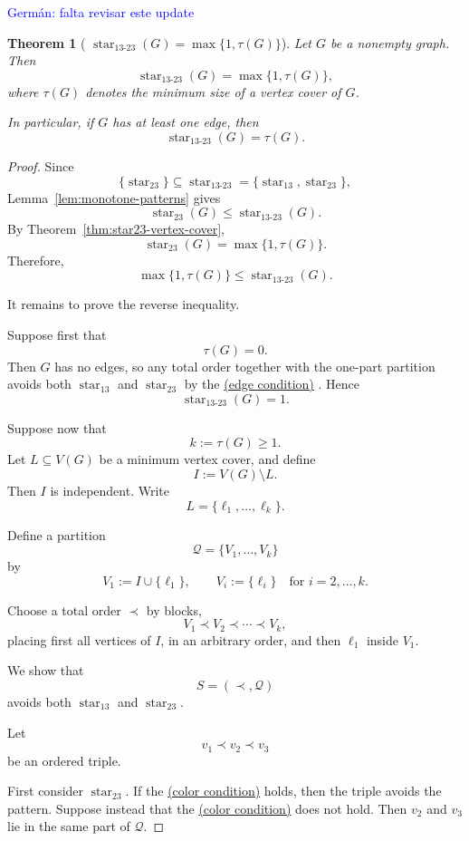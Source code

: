 \documentclass[12pt]{article}
\theoremstyle{plain}
\newtheorem{theorem}{Theorem}[section]
\theoremstyle{definition}
\theoremstyle{remark}
\theoremstyle{definition}
\newcommand{\edgecondition}{%
  \hyperref[def:avoid:cond:edge]{(edge condition)}\xspace
}
\newcommand{\colorcondition}{%
  \hyperref[def:avoid:cond:color]{(color condition)}\xspace
}
\newcommand{\starlabel}{\mathrm{star}}
\DeclareRobustCommand{\starparam}[1]{%
  \ensuremath{\mathop{\starlabel}\nolimits_{#1}}%
}
\newcommand{\german}[1]{%
  \textcolor{blue}{Germán: #1}%
}
\begin{document}
\german{falta revisar este update}

\begin{theorem}[
\texorpdfstring{
\(\starparam{13\text{-}23}(G)=\max\{1,\tau(G)\}\)}
{star13-23(G) = max\{1,tau(G)\}}
]
\label{thm:star13-23-vertex-cover}
Let \(G\) be a nonempty graph. Then
\[
\starparam{13\text{-}23}(G)
=
\max\{1,\tau(G)\},
\]
where \(\tau(G)\) denotes the minimum size of a vertex cover of \(G\).

In particular, if \(G\) has at least one edge, then
\[
\starparam{13\text{-}23}(G)=\tau(G).
\]
\end{theorem}

\begin{proof}
Since
\[
\{\starparam{23}\}
\subseteq
\starparam{13\text{-}23}
=
\{\starparam{13},\starparam{23}\},
\]
Lemma~\ref{lem:monotone-patterns} gives
\[
\starparam{23}(G)
\le
\starparam{13\text{-}23}(G).
\]
By Theorem~\ref{thm:star23-vertex-cover},
\[
\starparam{23}(G)=\max\{1,\tau(G)\}.
\]
Therefore,
\[
\max\{1,\tau(G)\}
\le
\starparam{13\text{-}23}(G).
\]

It remains to prove the reverse inequality.

Suppose first that
\[
\tau(G)=0.
\]
Then \(G\) has no edges, so any total order together with the one-part
partition avoids both \(\starparam{13}\) and \(\starparam{23}\) by the
\edgecondition{}. Hence
\[
\starparam{13\text{-}23}(G)=1.
\]

Suppose now that
\[
k:=\tau(G)\ge 1.
\]
Let \(L\subseteq V(G)\) be a minimum vertex cover, and define
\[
I:=V(G)\setminus L.
\]
Then \(I\) is independent. Write
\[
L=\{\ell_1,\dots,\ell_k\}.
\]

Define a partition
\[
\mathcal Q=\{V_1,\dots,V_k\}
\]
by
\[
V_1:=I\cup\{\ell_1\},
\qquad
V_i:=\{\ell_i\}
\quad
\text{for }i=2,\dots,k.
\]

Choose a total order \(\prec\) by blocks,
\[
V_1\prec V_2\prec\cdots\prec V_k,
\]
placing first all vertices of \(I\), in an arbitrary order, and then
\(\ell_1\) inside \(V_1\).

We show that
\[
S=(\prec,\mathcal Q)
\]
avoids both \(\starparam{13}\) and \(\starparam{23}\).

Let
\[
v_1\prec v_2\prec v_3
\]
be an ordered triple.

First consider \(\starparam{23}\). If the \colorcondition{} holds, then
the triple avoids the pattern. Suppose instead that the
\colorcondition{} does not hold. Then \(v_2\) and \(v_3\) lie in the
same part of \(\mathcal Q\).


\end{proof}
\end{document}
